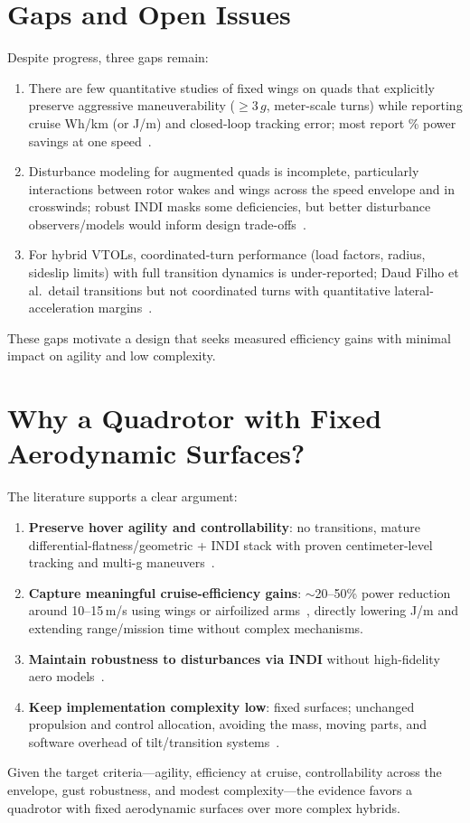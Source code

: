 \section{Gaps and Open Issues}

Despite progress, three gaps remain:
\begin{enumerate}
  \item There are few quantitative studies of fixed wings on quads that explicitly preserve aggressive maneuverability ($\geq 3\,g$, meter-scale turns) while reporting cruise Wh/km (or J/m) and closed-loop tracking error; most report \% power savings at one speed~\cite{Dawkins2018,Xiao2020}.
  \item Disturbance modeling for augmented quads is incomplete, particularly interactions between rotor wakes and wings across the speed envelope and in crosswinds; robust INDI masks some deficiencies, but better disturbance observers/models would inform design trade-offs~\cite{Sun2021}.
  \item For hybrid VTOLs, coordinated-turn performance (load factors, radius, sideslip limits) with full transition dynamics is under-reported; Daud Filho et al.\ detail transitions but not coordinated turns with quantitative lateral-acceleration margins~\cite{DaudFilho2024}.
\end{enumerate}
These gaps motivate a design that seeks measured efficiency gains with minimal impact on agility and low complexity.


\section{Why a Quadrotor with Fixed Aerodynamic Surfaces?}

The literature supports a clear argument:
\begin{enumerate}
  \item \textbf{Preserve hover agility and controllability}: no transitions, mature differential-flatness/geometric + INDI stack with proven centimeter-level tracking and multi-g maneuvers~\cite{Lee2010,Tal2018,Foehn2022}.
  \item \textbf{Capture meaningful cruise-efficiency gains}: $\sim$20--50\% power reduction around 10--15\,m/s using wings or airfoilized arms~\cite{Dawkins2018,Xiao2020,Freitas2025}, directly lowering J/m and extending range/mission time without complex mechanisms.
  \item \textbf{Maintain robustness to disturbances via INDI} without high-fidelity aero models~\cite{Sieberling2010,Smeur2017,Sun2021}.
  \item \textbf{Keep implementation complexity low}: fixed surfaces; unchanged propulsion and control allocation, avoiding the mass, moving parts, and software overhead of tilt/transition systems~\cite{Misra2022,Okulski2022}.
\end{enumerate}
Given the target criteria---agility, efficiency at cruise, controllability across the envelope, gust robustness, and modest complexity---the evidence favors a quadrotor with fixed aerodynamic surfaces over more complex hybrids.
